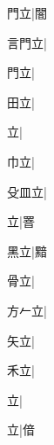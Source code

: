\begin{multicols}{2}
{{\cjk{}{\cnsym{}　}門立}\mktsJzrVerticalBar{}{\cjk{}{\cnsym{}　}{\cnsym{}　}{\cnsym{}　}}|{\cjk{}闇}\par
{\cjk{}言門立}\mktsJzrVerticalBar{}{\cjk{}{\cnsym{}　}{\cnsym{}　}{\cnsym{}　}}|{}\par
{門立}\mktsJzrVerticalBar{}{\cjk{}{\cnsym{}　}{\cnsym{}　}{\cnsym{}　}}|{}\par
{田立}\mktsJzrVerticalBar{}{\cjk{}{\cnsym{}　}{\cnsym{}　}{\cnsym{}　}}|{}\par
{立}|{}\par
{\cjk{}{\cnsym{}　}巾立}\mktsJzrVerticalBar{}{\cjk{}{\cnsym{}　}{\cnsym{}　}{\cnsym{}　}}|{}\par
{\cjk{}殳皿立}|{}\par
{立}\mktsJzrVerticalBar{}{\cjk{}{\cnsym{}　}{\cnsym{}　}{\cnsym{}　}}|{\cjk{}罯}\par
{\cjk{}{\cnsym{}　}黑立}\mktsJzrVerticalBar{}{\cjk{}{\cnsym{}　}{\cnsym{}　}{\cnsym{}　}}|{\cjk{}黯}\par
{\cjk{}{\cnsym{}　}骨立}\mktsJzrVerticalBar{}{\cjk{}{\cnsym{}　}{\cnsym{}　}{\cnsym{}　}}|{}\par
{\cjk{}方{\cnxHanaA{}𠂉}立}\mktsJzrVerticalBar{}{\cjk{}{\cnsym{}　}{\cnsym{}　}{\cnsym{}　}}|{}\par
{\cjk{}{\cnsym{}　}矢立}\mktsJzrVerticalBar{}{\cjk{}{\cnsym{}　}{\cnsym{}　}{\cnsym{}　}}|{}\par
{\cjk{}{\cnsym{}　}禾立}\mktsJzrVerticalBar{}{\cjk{}{\cnsym{}　}{\cnsym{}　}{\cnsym{}　}}|{}\par
{立}\mktsJzrVerticalBar{}{\cjk{}{\cnsym{}　}{\cnsym{}　}{\cnsym{}　}}|{}\par
{立}\mktsJzrVerticalBar{}{\cjk{}{\cnsym{}　}{\cnsym{}　}{\cnsym{}　}}|{\cjk{}偣}\par
}
\end{multicols}
